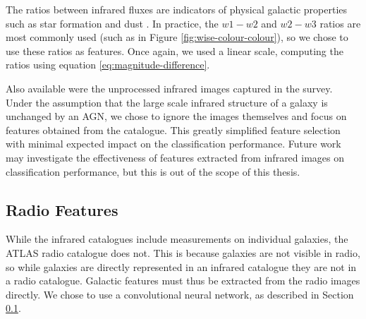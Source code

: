     The ratios between infrared fluxes are indicators of physical galactic
    properties such as star formation and dust . In practice, the $w1 - w2$ and $w2 - w3$
    ratios are most commonly used (such as in Figure
    \ref{fig:wise-colour-colour}), so we chose to use these ratios as features.
    Once again, we used a linear scale, computing the ratios using equation
    \ref{eq:magnitude-difference}.

    Also available were the unprocessed infrared images captured in the survey.
    Under the assumption that the large scale infrared structure of a galaxy is
    unchanged by an AGN, we chose to ignore the images themselves and focus on
    features obtained from the catalogue. This greatly simplified feature
    selection with minimal expected impact on the classification performance.
    Future work may investigate the effectiveness of features extracted from
    infrared images on classification performance, but this is out of the scope
    of this thesis.




  \subsection{Radio Features}
  \label{sec:image-features}

    While the infrared catalogues include measurements on individual galaxies,
    the ATLAS radio catalogue does not. This is because galaxies are not
    visible in radio, so while galaxies are directly represented in an infrared
    catalogue they are not in a radio catalogue. Galactic features must thus be
    extracted from the radio images directly. We chose to use a convolutional
    neural network, as described in Section \ref{sec:image-features}.

